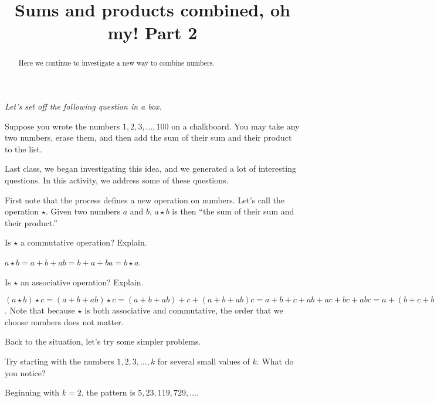 \documentclass{ximera}
\title{Sums and products combined, oh my!  Part 2}
\begin{document}
\begin{abstract}
Here we continue to investigate a new way to combine numbers.
\end{abstract}
\maketitle

\emph{Let's set off the following question in a box.} 

Suppose you wrote the numbers $1,2,3,\dots,100$ on a chalkboard. You
may take any two numbers, erase them, and then add the sum of their
sum and their product to the list.

Last class, we began investigating this idea, and we generated a lot of interesting questions.  
In this activity, we address some of these questions.  

First note that the process defines a new operation on numbers.  Let's call the operation $\star$.  Given two numbers $a$ and $b$,  $a\star b$ is then ``the sum of their sum and their product.''    

\begin{problem}
Is $\star$ a commutative operation?  Explain.  
\begin{freeResponse}
$a\star b = a+b+ab= b+a+ba = b\star a$.  
\end{freeResponse}
\end{problem}

\begin{problem}
Is $\star$ an associative operation?  Explain.  
\begin{freeResponse}
$(a\star b)\star c = (a+b+ab)\star c = (a+b+ab)+c + (a+b+ab)c 
= a + b + c + ab + ac + bc + abc = a+(b+c+bc) + a(b+c+bc) =
a\star (b+c+bc) = a \star(b\star c)$.  Note that because $\star$ is both associative 
and commutative, the order that we choose numbers does not matter.  
\end{freeResponse}
\end{problem}

Back to the situation, let's try some simpler problems.  

\begin{problem}
Try starting with the numbers $1,2,3,\dots, k$ for several small values of $k$.  What do you notice?  
\begin{freeResponse}
Beginning with $k = 2$, the pattern is $5, 23, 119, 729, \dots$.  
\end{freeResponse}
\end{problem}
\end{document}
